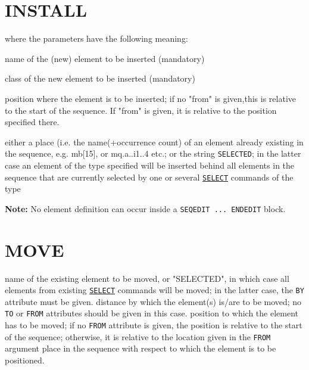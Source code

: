 \section{INSTALL}
\label{sec:install}
where the parameters have the following meaning: 
\begin{madlist}
    name of the (new) element to be inserted (mandatory) 

    class of the new element to be inserted (mandatory) 

    position where the element is to be inserted; if no "from"
     is given,this is relative to the start of the sequence. If "from"
     is given, it is relative to the position specified there. 

    either a place (i.e. the name(+occurrence count) of an
     element already existing in the sequence, e.g. mb[15], or
     mq.a..i1..4 etc.; or the string {\tt SELECTED}; in the latter case an
     element of the type specified will be inserted behind all elements
     in the sequence that are currently selected by one or several
     \hyperref[sec:select]{\tt SELECT} commands of the type 
\end{madlist}

{\bf Note:} No element definition can occur inside a {\tt SEQEDIT ... ENDEDIT} 
block.

\section{MOVE}
\label{sec:move}
\begin{madlist}
    name of the existing element to be moved, or
     "SELECTED", in which case all elements from existing
     \hyperref[sec:select]{\tt SELECT} commands will be moved;
     in the latter case, the {\tt BY} attribute must be given.  
    distance by which the element(s) is/are to be moved; no {\tt TO}
    or {\tt FROM} attributes should be given in this case.  
    position to which the element has to be moved; if no {\tt FROM}
   attribute is given, the position is relative to the start of the sequence; otherwise, it
     is relative to the location given in the {\tt FROM} argument  
    place in the sequence with respect to which the element
     is to be positioned.  
\end{madlist}

